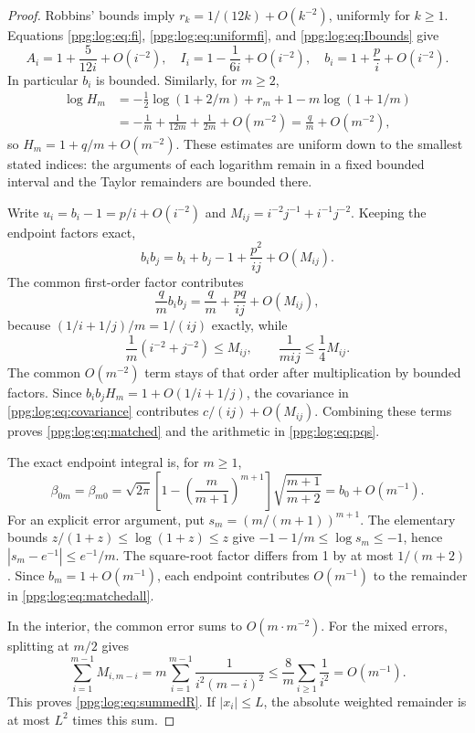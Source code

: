 \documentclass[11pt,letterpaper]{article}
\theoremstyle{remark}\newtheorem{remark}[theorem]{Remark}
\numberwithin{equation}{section}
\begin{document}
\begin{proof}
Robbins' bounds imply $r_k=1/(12k)+O(k^{-2})$, uniformly for $k\ge1$. Equations \eqref{ppg:log:eq:fi}, \eqref{ppg:log:eq:uniformfi}, and \eqref{ppg:log:eq:Ibounds} give
\begin{equation}\label{ppg:log:eq:bHexp}
 A_i=1+\frac5{12i}+O(i^{-2}),\quad
 I_i=1-\frac1{6i}+O(i^{-2}),\quad
 b_i=1+\frac p i+O(i^{-2}).
\end{equation}
In particular $b_i$ is bounded. Similarly, for $m\ge2$,
\begin{align*}
 \log H_m
 &=-\tfrac12\log(1+2/m)+r_m+1-m\log(1+1/m)\\
 &=-\frac1m+\frac1{12m}+\frac1{2m}+O(m^{-2})
   =\frac q m+O(m^{-2}),
\end{align*}
so $H_m=1+q/m+O(m^{-2})$. These estimates are uniform down to the smallest stated indices: the arguments of each logarithm remain in a fixed bounded interval and the Taylor remainders are bounded there.

Write $u_i=b_i-1=p/i+O(i^{-2})$ and $M_{ij}=i^{-2}j^{-1}+i^{-1}j^{-2}$. Keeping the endpoint factors exact,
\[
 b_ib_j=b_i+b_j-1+\frac{p^2}{ij}+O(M_{ij}).
\]
The common first-order factor contributes
\[
 \frac q m b_ib_j=\frac q m+\frac{pq}{ij}+O(M_{ij}),
\]
because $(1/i+1/j)/m=1/(ij)$ exactly, while
\[
 \frac1m(i^{-2}+j^{-2})\le M_{ij},\qquad
 \frac1{mij}\le\frac14M_{ij}.
\]
The common $O(m^{-2})$ term stays of that order after multiplication by bounded factors. Since $b_ib_jH_m=1+O(1/i+1/j)$, the covariance in \eqref{ppg:log:eq:covariance} contributes $c/(ij)+O(M_{ij})$. Combining these terms proves \eqref{ppg:log:eq:matched} and the arithmetic in \eqref{ppg:log:eq:pqs}.

The exact endpoint integral is, for $m\ge1$,
\begin{equation}\label{ppg:log:eq:exactendpoint}
 \beta_{0m}=\beta_{m0}
 =\sqrt{2\pi}\left[1-\left(\frac m{m+1}\right)^{m+1}\right]
               \sqrt{\frac{m+1}{m+2}}=b_0+O(m^{-1}).
\end{equation}
For an explicit error argument, put $s_m=(m/(m+1))^{m+1}$. The elementary bounds $z/(1+z)\le\log(1+z)\le z$ give $-1-1/m\le\log s_m\le-1$, hence $|s_m-e^{-1}|\le e^{-1}/m$. The square-root factor differs from 1 by at most $1/(m+2)$. Since $b_m=1+O(m^{-1})$, each endpoint contributes $O(m^{-1})$ to the remainder in \eqref{ppg:log:eq:matchedall}.

In the interior, the common error sums to $O(m\cdot m^{-2})$. For the mixed errors, splitting at $m/2$ gives
\begin{equation}\label{ppg:log:eq:mixedsum}
 \sum_{i=1}^{m-1}M_{i,m-i}
 =m\sum_{i=1}^{m-1}\frac1{i^2(m-i)^2}
 \le\frac8m\sum_{i\ge1}\frac1{i^2}=O(m^{-1}).
\end{equation}
This proves \eqref{ppg:log:eq:summedR}. If $|x_i|\le L$, the absolute weighted remainder is at most $L^2$ times this sum.
\end{proof}
\end{document}
